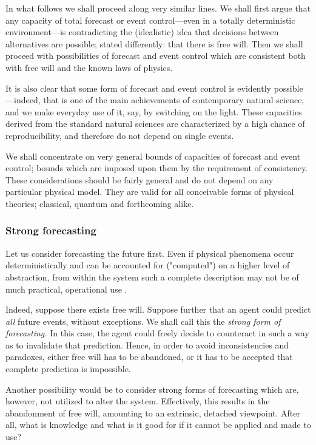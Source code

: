 In what follows we shall proceed along very similar lines.
We shall first argue that any capacity of
total forecast or event
control---even in a totally deterministic environment---is
contradicting the (idealistic) idea that decisions between alternatives are possible;
stated differently: that there is free will.
Then we shall proceed with possibilities of forecast and event control
which are consistent both with free will and the known laws of physics.

It is also clear that some form of forecast and event control
is evidently possible---indeed, that is one of the main achievements of
contemporary natural science, and we make everyday use of it, say, by switching
on the light.
These  capacities derived from the standard natural sciences are
characterized by a high chance of reproducibility, and therefore do not
depend on single events.

We shall concentrate on very general bounds of
capacities of forecast and event control;
bounds which are imposed upon them by the requirement of consistency.
These considerations should be fairly general
and do not depend on any particular physical model.
They are valid for all conceivable forms of physical theories; classical,
quantum and forthcoming alike.

\subsubsection*{Strong forecasting}
Let us consider forecasting the future first.
Even if physical phenomena occur
deterministically and can be accounted for ("computed") on a higher
level of abstraction, from within the system such a complete description
may not be of much practical, operational use
\cite{toffoli:79,svozil-unev}.

Indeed, suppose there exists free will. Suppose further that an agent could
predict {\em all} future events, without exceptions.
We shall call this the
{\em strong form of forecasting.}
In this case, the agent could freely decide to
counteract in such a way as to invalidate that prediction.
Hence, in order to avoid inconsistencies and  paradoxes,
either free will has to be abandoned,
or it has to be accepted that complete prediction is impossible.

Another possibility would be to consider strong forms of forecasting
which are, however, not utilized to alter the system.
Effectively, this results in the abandonment of free will,
amounting to an extrinsic, detached viewpoint.
After all, what is knowledge and what is it good for if it cannot be
applied and made to use?

